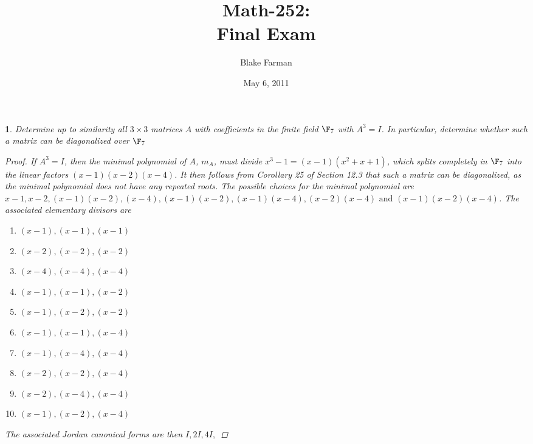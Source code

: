 \documentclass[10pt]{amsart}
\author{Blake Farman}
\title{Math-252:\\Final Exam}
\date{May 6, 2011}
\begin{document}
\maketitle

\newtheorem{thm}{}

\begin{thm}
  \label{Ex1}
  Determine up to similarity all $3 \times 3$ matrices $A$ with coefficients in the finite field $\F_7$ with $A^3 = I$.
  In particular, determine whether such a matrix can be diagonalized over $\F_7$
  
  \begin{proof}
    If $A^3 = I$, then the minimal polynomial of $A$, $m_A$, must divide $x^3 - 1 = (x-1)(x^2 + x + 1)$, which splits completely in $\F_7$ into the linear factors $(x-1)(x-2)(x-4)$.
    It then follows from Corollary 25 of Section 12.3 that such a matrix can be diagonalized, as the minimal polynomial does not have any repeated roots.
    The possible choices for the minimal polynomial are $x-1, x-2, (x-1)(x-2), (x-4), (x-1)(x-2), (x-1)(x-4), (x-2)(x-4) \text{ and } (x-1)(x-2)(x-4)$.
    The associated elementary divisors are
    \begin{enumerate}
    \item
      $(x-1),(x-1),(x-1)$
    \item
      $(x-2),(x-2),(x-2)$
    \item
      $(x-4),(x-4),(x-4)$
    \item
      $(x-1),(x-1),(x-2)$
    \item
      $(x-1),(x-2),(x-2)$
    \item
      $(x-1),(x-1),(x-4)$
    \item
      $(x-1),(x-4),(x-4)$
    \item
      $(x-2),(x-2),(x-4)$
    \item
      $(x-2),(x-4),(x-4)$
    \item
      $(x-1),(x-2),(x-4)$
    \end{enumerate}
    The associated Jordan canonical forms are then $I, 2I, 4I,$ 
  

\end{proof}
\end{thm}
\end{document}
